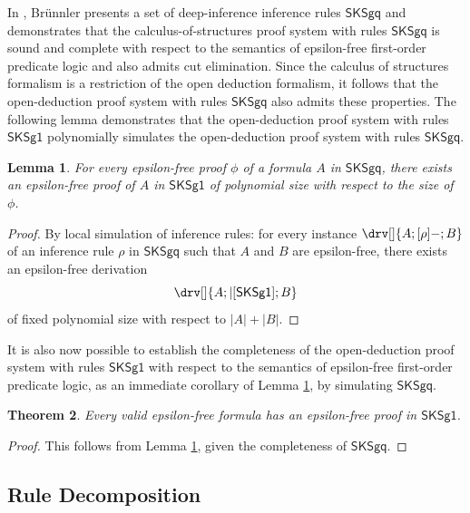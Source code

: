 \documentclass[10pt]{article}
\newtheorem{theorem}{Theorem}[section]
\newtheorem{lemma}[theorem]{Lemma}
\theoremstyle{definition}\newtheorem{remark}[theorem]{Remark}
\theoremstyle{definition}\newtheorem{example}[theorem]{Example}
\theoremstyle{definition}\newtheorem{definition}[theorem]{Definition}
\newcommand{\SKSq}{{\mathsf{SKSg1}}}
\begin{document}
	In \cite{KaiCutElimination}, Brünnler presents a set of deep-inference inference rules $\mathsf{SKSgq}$ and demonstrates that the calculus-of-structures proof system with rules $\mathsf{SKSgq}$ is sound and complete with respect to the semantics of epsilon-free first-order predicate logic and also admits cut elimination. Since the calculus of structures formalism is a restriction of the open deduction formalism, it follows that the open-deduction proof system with rules $\mathsf{SKSgq}$ also admits these properties. The following lemma demonstrates that the open-deduction proof system with rules $\SKSq$ polynomially simulates the open-deduction proof system with rules $\mathsf{SKSgq}$.
	
	\begin{lemma}\label{SKSgqSimulation}
		For every epsilon-free proof $\phi$ of a formula $A$ in $\mathsf{SKSgq}$, there exists an epsilon-free proof of $A$ in $\SKSq$ of polynomial size with respect to the size of $\phi$.
	\end{lemma}
	
	\begin{proof}
		By local simulation of inference rules: for every instance $\drv[] {A ; [\rho]- ; B}$ of an inference rule $\rho$ in $\mathsf{SKSgq}$ such that $A$ and $B$ are epsilon-free, there exists an epsilon-free derivation
		\[
			\drv[] {
				A ; |[\SKSq] ; B
			}
		\]
		of fixed polynomial size with respect to $| A | + | B |$.
	\end{proof}
	
	It is also now possible to establish the completeness of the open-deduction proof system with rules $\SKSq$ with respect to the semantics of epsilon-free first-order predicate logic, as an immediate corollary of Lemma \ref{SKSgqSimulation}, by simulating $\mathsf{SKSgq}$.
	
	\begin{theorem}\label{CompleteSKSq}
		Every valid epsilon-free formula has an epsilon-free proof in $\SKSq$.
	\end{theorem}
	
	\begin{proof}
		This follows from Lemma \ref{SKSgqSimulation}, given the completeness of $\mathsf{SKSgq}$.
	\end{proof}
	
	\subsection{Rule Decomposition}\label{RuleAdmissibilitySection}
	
\end{document}
